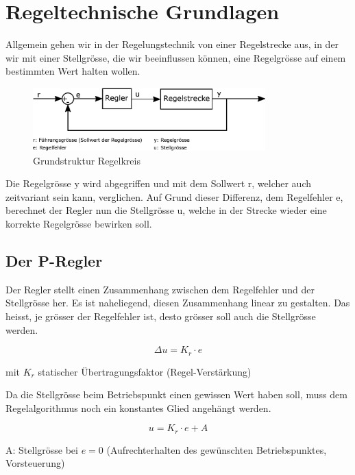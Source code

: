 \documentclass[a4paper,10pt,oneside]{article}
\begin{document}
\section{Regeltechnische Grundlagen}

Allgemein gehen wir in der Regelungstechnik von einer Regelstrecke aus, in der wir mit einer Stellgrösse, die wir beeinflussen können, eine Regelgrösse auf einem bestimmten Wert halten wollen.

\begin{figure}[H]
\centering
\includegraphics[width=0.8\textwidth]{img/regelkreis.eps}
\caption{Grundstruktur Regelkreis}
\label{regelkreis}
\end{figure}


Die Regelgrösse y wird abgegriffen und mit dem Sollwert r, welcher auch zeitvariant sein kann, verglichen. Auf Grund dieser Differenz, dem Regelfehler e, berechnet der Regler nun die Stellgrösse u, welche in der Strecke wieder eine korrekte Regelgrösse bewirken soll.

\subsection{Der P-Regler}
Der Regler stellt einen Zusammenhang zwischen dem Regelfehler und der Stellgrösse her. Es ist naheliegend, diesen Zusammenhang linear zu gestalten. Das heisst, je grösser der Regelfehler ist, desto grösser soll auch die Stellgrösse werden.

\begin{equation}
\Delta u = K_r \cdot e
\end{equation}

mit $K_r$ statischer Übertragungsfaktor (Regel-Verstärkung)

Da die Stellgrösse beim Betriebspunkt einen gewissen Wert haben soll, muss dem Regelalgorithmus noch ein konstantes Glied angehängt werden.

\begin{equation}
u = K_r \cdot e + A
\end{equation}

A: Stellgrösse bei $e=0$ (Aufrechterhalten des gewünschten Betriebspunktes, Vorsteuerung)
\end{document}
